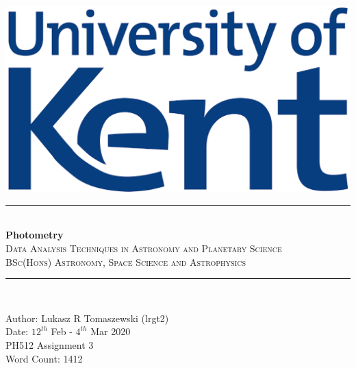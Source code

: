 \documentclass[12pt]{article}
\title{}
\begin{document}
\begin{titlepage}
\newcommand{\HRule}{\rule{\linewidth}{0.5mm}}
\begin{centering} 

\includegraphics[scale=0.7]{Images/Uni_of_Kent.png}\\[0.3cm]
\HRule \\ [0.3cm]
\Huge{\bfseries{Photometry}} \\
\textsc{\large Data Analysis Techniques in Astronomy and Planetary Science}\\ [-0.1cm]
\textsc{\large BSc(Hons) Astronomy, Space Science and Astrophysics}\\ [-0.2cm]
\HRule \\[0.5cm]
\begin{minipage}{0.625\textwidth}
\begin{center} \large
{\large Author: Lukasz R Tomaszewski (lrgt2)} \\[0.2cm]
{\large Date: $12^{th}$ Feb - $4^{th}$ Mar 2020}\\[0.2cm]
{\large PH512 Assignment 3} \\[0.2cm]
{\large Word Count: 1412} \\
\end{center}
\end{minipage}\\[1cm]
\end{centering} 
\begin{tableofcontents}
\end{tableofcontents}
\end{titlepage}
\newpage
\end{document}
